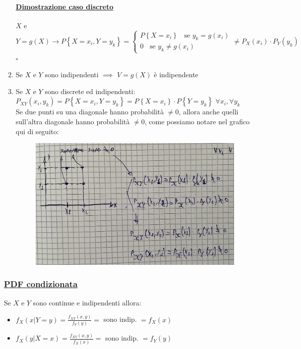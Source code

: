 \documentclass{article}
\begin{document}
\begin{enumerate}
    \paragraph{\underline{Dimostrazione caso discreto}}
    $X$ e $Y=g(X) \rightarrow P\left\{ X = x_i, Y = y_k\right\} = 
    \begin{cases}
        P\left\{ X = x_i \right\}\;\; \text{ se } y_k = g(x_i) \\
        0\;\; \text{ se } y_k \neq g(x_i)
    \end{cases} \neq P_X(x_i) \cdot P_Y(y_k)$ \\
    \hspace*{0pt}\hfill $\square$
    \item Se $X$ e $Y$ sono indipendenti $\implies$ $V = g(X)$ è indipendente 
    \item Se $X$ e $Y$ sono discrete ed indipendenti: \\
    $P_{XY}(x_i,y_k) = P\left\{ X = x_i, Y = y_k \right\} = P\left\{ X = x_i\right\} \cdot P\left\{ Y = y_k\right\}$   $\forall x_i,\forall y_k$ \\
    Se due punti su una diagonale hanno probabilità $\neq 0$, allora anche quelli sull'altra diagonale hanno probabilità $\neq 0$, come possiamo notare nel grafico qui di seguito:
    \begin{figure}[ht]
    \centering
    \includegraphics[scale=0.14]{images/81.jpeg}
    \end{figure} 
\end{enumerate}
\subsubsection{\underline{PDF condizionata}}
Se $X$ e $Y$ sono continue e indipendenti allora: 
\begin{itemize}
    \item $f_X(x|Y = y) = \frac{f_{XY}(x,y)}{f_Y(y)} =$ sono indip. $= f_X(x)$
    \item $f_X(y|X = x) = \frac{f_{XY}(x,y)}{f_X(x)} =$ sono indip. $= f_Y(y)$
\end{itemize}
\end{document}
